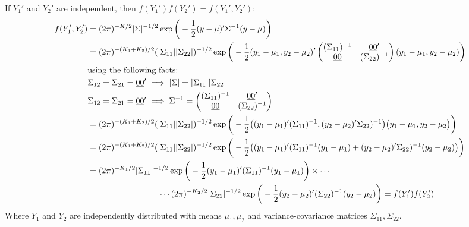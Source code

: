\documentclass{article}[12pt]
\begin{document}
\begin{enumerate}
	If $Y_1'$  and $Y_2'$ are independent, then $f(Y_1')f(Y_2') = f(Y_1',Y_2')$:
	\begin{align*}
		f(Y_1',Y_2') &= (2\pi)^{-K/2} |\Sigma|^{-1/2} \exp \bigg( -\frac{1}{2} (y - \mu)' \Sigma^{-1} (y - \mu) \bigg)\\
		&= (2\pi)^{-(K_1+K_2)/2} (|\Sigma_{11}||\Sigma_{22}|)^{-1/2} \exp \bigg(-\frac{1}{2} (y_1-\mu_1, y_2 - \mu_2)' \begin{pmatrix} (\Sigma_{11})^{-1} & \underline{00}' \\ \underline{00} & (\Sigma_{22})^{-1} \\ \end{pmatrix} (y_1-\mu_1, y_2 - \mu_2) \bigg) \\
			& \mbox{using the following facts:}\\
			& \Sigma_{12} = \Sigma_{21} = \underline{00}' \implies |\Sigma|=|\Sigma_{11}| |\Sigma_{22}| \\
			& \Sigma_{12} = \Sigma_{21} = \underline{00}' \implies \Sigma^{-1} =
				\begin{pmatrix}
					(\Sigma_{11})^{-1} & \underline{00}' \\
					\underline{00} & (\Sigma_{22})^{-1} \\
				\end{pmatrix}\\
		&= (2\pi)^{-(K_1+K_2)/2} (|\Sigma_{11}||\Sigma_{22}|)^{-1/2} \exp \bigg(-\frac{1}{2} \big((y_1-\mu_1)'(\Sigma_{11})^{-1}, (y_2 - \mu_2)' \Sigma_{22})^{-1} \big) \big(y_1-\mu_1, y_2 - \mu_2\big) \bigg) \\
		&= (2\pi)^{-(K_1+K_2)/2} (|\Sigma_{11}||\Sigma_{22}|)^{-1/2} \exp \bigg(-\frac{1}{2} \big((y_1-\mu_1)'(\Sigma_{11})^{-1}(y_1-\mu_1) + (y_2 - \mu_2)' \Sigma_{22})^{-1} (y_2 - \mu_2) \big) \bigg) \\
		&= (2\pi)^{-K_1/2} |\Sigma_{11}|^{-1/2} \exp \bigg(-\frac{1}{2} (y_1-\mu_1)'(\Sigma_{11})^{-1}(y_1-\mu_1) \bigg) \times \cdots \\
			& \mbox{\hspace{3cm}} \cdots (2\pi)^{-K_2/2} |\Sigma_{22}|^{-1/2} \exp \bigg(-\frac{1}{2} (y_2 - \mu_2)' (\Sigma_{22})^{-1} (y_2 - \mu_2) \bigg) = f(Y_1')f(Y_2')
	\end{align*}
	Where $Y_1$ and $Y_2$ are independently distributed with means $\mu_1, \mu_2$ and variance-covariance matrices $\Sigma_{11}, \Sigma_{22}$.


\end{enumerate}
\end{document}
